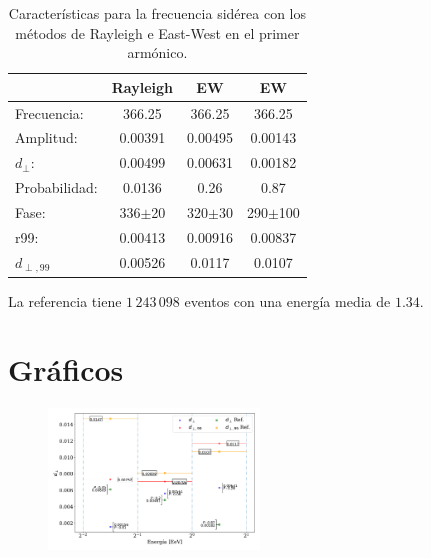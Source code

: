     \begin{table}[H]
        \begin{small}
            \begin{center}
                \begin{tabular}[c]{l|c||c|c}
                                    & Rayleigh     & EW         & EW\cite{Aab_2020}      \\\hline
                    Frecuencia:     & 366.25	   & 366.25     & 366.25      \\
                    Amplitud:       & 0.00391	   & 0.00495    & 0.00143      \\
                    $d_\perp$:      & 0.00499      & 0.00631    & 0.00182      \\ 
                    Probabilidad:   & 0.0136	   & 0.26       & 0.87          \\
                    Fase:           & 336$\pm$20   & 320$\pm$30 & 290$\pm$100      \\
                    r99:            & 0.00413	   & 0.00916    & 0.00837      \\
                    $d_{\perp,99}$  & 0.00526      & 0.0117     & 0.0107       \\
                \end{tabular}
            \end{center}
        \end{small}
        \caption{Características para la frecuencia sidérea con los métodos de Rayleigh  e East-West en el primer armónico.}
        \label{tab:solar}
    \end{table}

    La referencia tiene $1\,243\,098$ eventos con una energía media de $1.34$.


    \section*{Gráficos}

    \begin{figure}[H]
        \begin{small}
            \begin{center}
                \includegraphics[width=0.5\textwidth]{d_perp_no_normalizado.pdf}
            \end{center}
            \caption{}
            \label{fig:}
        \end{small}
    \end{figure}
    


